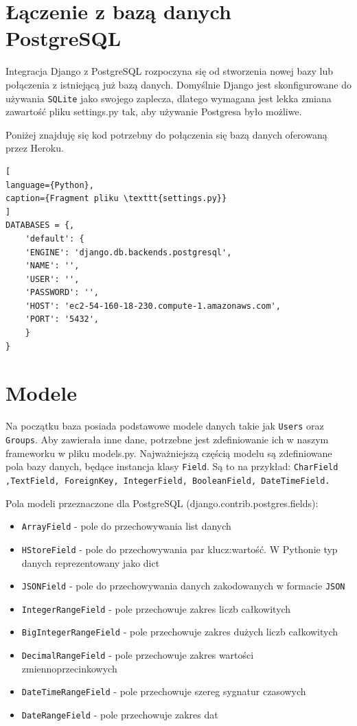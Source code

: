 \documentclass[oneside,polski,logo,indent]{amuthesis}
\begin{document}
\section{Łączenie z bazą danych PostgreSQL}
Integracja Django z PostgreSQL rozpoczyna się od stworzenia nowej bazy lub połączenia z istniejącą już bazą danych.
Domyślnie Django jest skonfigurowane do używania \texttt{SQLite} jako swojego zaplecza, dlatego wymagana jest lekka zmiana zawartość pliku settings.py tak, aby używanie Postgresa było możliwe. 

Poniżej znajduję się kod potrzebny do połączenia się bazą danych oferowaną przez Heroku. 
\begin{lstlisting}[
language={Python},
caption={Fragment pliku \texttt{settings.py}}
]
DATABASES = {,  
	'default': { 
	'ENGINE': 'django.db.backends.postgresql', 
	'NAME': '', 
	'USER': '', 
	'PASSWORD': '', 
	'HOST': 'ec2-54-160-18-230.compute-1.amazonaws.com', 
	'PORT': '5432', 
	} 
} 
\end{lstlisting}
\section{Modele}

Na początku baza posiada podstawowe modele danych takie jak  \texttt{Users} oraz \texttt{Groups}. Aby zawierała inne dane, potrzebne jest zdefiniowanie ich w naszym frameworku w pliku models.py.
Najważniejszą częścią modelu są zdefiniowane pola bazy danych, będące instancja klasy \texttt{Field}. Są to na przykład:  \texttt{CharField ,TextField, ForeignKey, IntegerField, BooleanField, DateTimeField.}

Pola modeli przeznaczone dla PostgreSQL (django.contrib.postgres.fields):
\begin{itemize}
	\item \texttt{ArrayField} - pole do przechowywania list danych
	\item \texttt{HStoreField} - pole do przechowywania par klucz:wartość. W Pythonie typ danych reprezentowany jako dict
	\item \texttt{JSONField} - pole do przechowywania danych zakodowanych w formacie \texttt{JSON}
	\item \texttt{IntegerRangeField} - pole przechowuje zakres liczb całkowitych
	\item \texttt{BigIntegerRangeField} - pole przechowuje zakres dużych liczb całkowitych
	\item \texttt{DecimalRangeField} - pole przechowuje zakres wartości zmiennoprzecinkowych
	\item \texttt{DateTimeRangeField} - pole przechowuje szereg sygnatur czasowych
	\item \texttt{DateRangeField} - pole przechowuje zakres dat
\end{itemize}
\end{document}
